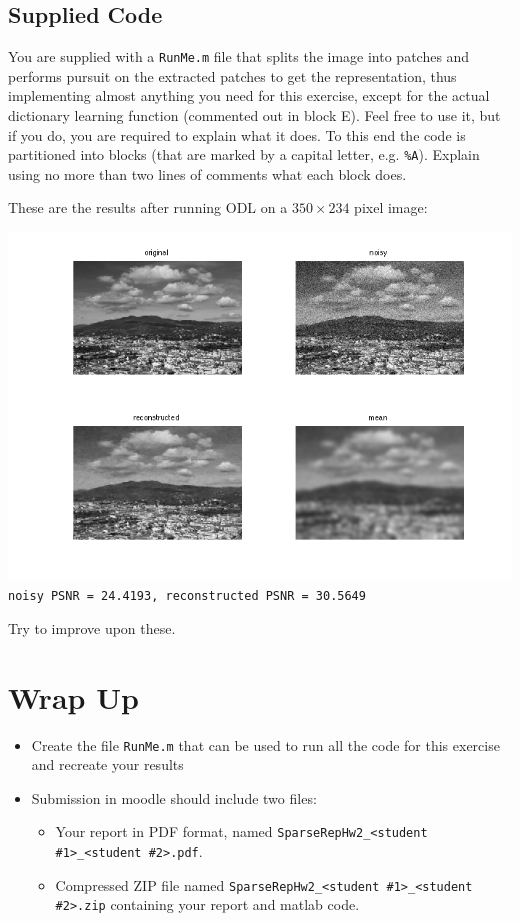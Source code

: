 \documentclass[]{article}
\newcommand{\code}{\item[\faKeyboardO]}
\begin{document}
		\subsection{Supplied Code} 
		You are supplied with a \lstinline|RunMe.m| file that splits the image into patches and performs pursuit on the extracted patches to get the representation, thus implementing almost anything you need for this exercise, except for the actual dictionary learning function (commented out in block E). 
		Feel free to use it, but if you do, you are required to explain what it does. To this end the code is partitioned into blocks (that are marked by a capital letter, e.g. \lstinline|%A|). Explain using no more than two lines of comments what each block does.  
		
		These are the results after running ODL on a $350 \times 234$ pixel image: 
		\begin{center}
			\includegraphics[width=1\linewidth]{fig/data}
			\lstinline|noisy PSNR = 24.4193, reconstructed PSNR = 30.5649|
		\end{center}
		Try to improve upon these.
		
		\section*{Wrap Up}
		\begin{itemize}
			\code Create the file \lstinline|RunMe.m| that can be used to run all the code for this exercise and recreate your results 
			\item Submission in moodle should include two files: 
			\begin{itemize}
				\item Your report in PDF format, named \lstinline|SparseRepHw2_<student #1>_<student #2>.pdf|.
				\item Compressed ZIP file named \lstinline|SparseRepHw2_<student #1>_<student #2>.zip| containing your report and matlab code.  
			\end{itemize}   
		\end{itemize}
		
		
		{}
	
\end{document}
